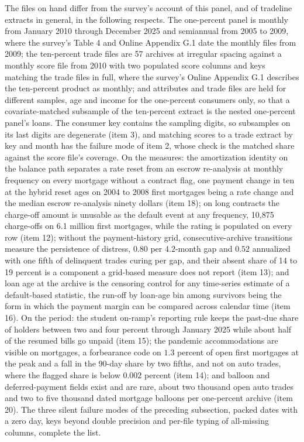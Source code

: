 The files on hand differ from the survey's account of this panel, and of tradeline extracts in general, in the following respects. The one-percent panel is monthly from January 2010 through December 2025 and semiannual from 2005 to 2009, where the survey's Table 4 and Online Appendix G.1 date the monthly files from 2009; the ten-percent trade files are 57 archives at irregular spacing against a monthly score file from 2010 with two populated score columns and keys matching the trade files in full, where the survey's Online Appendix G.1 describes the ten-percent product as monthly; and attributes and trade files are held for different samples, age and income for the one-percent consumers only, so that a covariate-matched subsample of the ten-percent extract is the nested one-percent panel's loans. The consumer key contains the sampling digits, so subsamples on its last digits are degenerate (item 3), and matching scores to a trade extract by key and month has the failure mode of item 2, whose check is the matched share against the score file's coverage. On the measures: the amortization identity on the balance path separates a rate reset from an escrow re-analysis at monthly frequency on every mortgage without a contract flag, one payment change in ten at the hybrid reset ages on 2004 to 2008 first mortgages being a rate change and the median escrow re-analysis ninety dollars (item 18); on long contracts the charge-off amount is unusable as the default event at any frequency, 10,875 charge-offs on 6.1 million first mortgages, while the rating is populated on every row (item 12); without the payment-history grid, consecutive-archive transitions measure the persistence of distress, $0.80$ per $4.2$-month gap and $0.52$ annualized with one fifth of delinquent trades curing per gap, and their absent share of 14 to 19 percent is a component a grid-based measure does not report (item 13); and loan age at the archive is the censoring control for any time-series estimate of a default-based statistic, the run-off by loan-age bin among survivors being the form in which the payment margin can be compared across calendar time (item 16). On the period: the student on-ramp's reporting rule keeps the past-due share of holders between two and four percent through January 2025 while about half of the resumed bills go unpaid (item 15); the pandemic accommodations are visible on mortgages, a forbearance code on $1.3$ percent of open first mortgages at the peak and a fall in the 90-day share by two fifths, and not on auto trades, where the flagged share is below $0.002$ percent (item 14); and balloon and deferred-payment fields exist and are rare, about two thousand open auto trades and two to five thousand dated mortgage balloons per one-percent archive (item 20). The three silent failure modes of the preceding subsection, packed dates with a zero day, keys beyond double precision and per-file typing of all-missing columns, complete the list.
